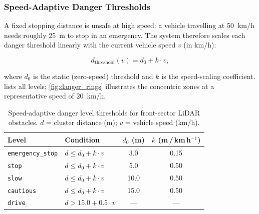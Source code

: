 \documentclass[12pt,a4paper]{article}
\begin{document}
\subsubsection{Speed-Adaptive Danger Thresholds}
\label{subsubsec:danger_thresholds}

A fixed stopping distance is unsafe at high speed: a vehicle travelling at
\SI{50}{km/h} needs roughly \SI{25}{\metre} to stop in an emergency.  The
system therefore scales each danger threshold linearly with the current vehicle
speed $v$ (in \si{km/h}):

\begin{equation}
  d_{\text{threshold}}(v) = d_0 + k \cdot v,
  \label{eq:speed_adaptive}
\end{equation}

where $d_0$ is the static (zero-speed) threshold and $k$ is the
speed-scaling coefficient.   lists all
levels; \cref{fig:danger_rings} illustrates the concentric zones at a
representative speed of \SI{20}{km/h}.

\begin{table}[H]
\centering
\caption{Speed-adaptive danger level thresholds for front-sector LiDAR
  obstacles.  $d$ = cluster distance (m); $v$ = vehicle speed (km/h).}
\label{tab:lidar_danger_thresholds}
\begin{tabular}{@{}llcc@{}}
\toprule
\textbf{Level} & \textbf{Condition} &
\textbf{$d_0$ (m)} & \textbf{$k$ (m\,/\,km\,h$^{-1}$)} \\
\midrule
\texttt{emergency\_stop} & $d \le d_0 + k\cdot v$ & 3.0  & 0.15 \\
\texttt{stop}            & $d \le d_0 + k\cdot v$ & 5.0  & 0.50 \\
\texttt{slow}            & $d \le d_0 + k\cdot v$ & 10.0 & 0.50 \\
\texttt{cautious}        & $d \le d_0 + k\cdot v$ & 15.0 & 0.50 \\
\texttt{drive}           & $d > 15.0 + 0.5\cdot v$ & --- & --- \\
\bottomrule
\end{tabular}
\end{table}
\end{document}

